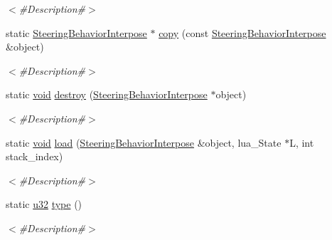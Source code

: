 \begin{DoxyCompactItemize}
\begin{DoxyCompactList}\small\item\em $<$\#\+Description\#$>$ \end{DoxyCompactList}\item 
static \mbox{\hyperlink{classnjli_1_1_steering_behavior_interpose}{Steering\+Behavior\+Interpose}} $\ast$ \mbox{\hyperlink{classnjli_1_1_steering_behavior_interpose_a783a835d9c0bbbe7b99426667ac9afd5}{copy}} (const \mbox{\hyperlink{classnjli_1_1_steering_behavior_interpose}{Steering\+Behavior\+Interpose}} \&object)
\begin{DoxyCompactList}\small\item\em $<$\#\+Description\#$>$ \end{DoxyCompactList}\item 
static \mbox{\hyperlink{_thread_8h_af1e856da2e658414cb2456cb6f7ebc66}{void}} \mbox{\hyperlink{classnjli_1_1_steering_behavior_interpose_ad15b4e28b4593217f193a84ae32168bd}{destroy}} (\mbox{\hyperlink{classnjli_1_1_steering_behavior_interpose}{Steering\+Behavior\+Interpose}} $\ast$object)
\begin{DoxyCompactList}\small\item\em $<$\#\+Description\#$>$ \end{DoxyCompactList}\item 
static \mbox{\hyperlink{_thread_8h_af1e856da2e658414cb2456cb6f7ebc66}{void}} \mbox{\hyperlink{classnjli_1_1_steering_behavior_interpose_a1697eccc9b53896e05a77d088a1dc862}{load}} (\mbox{\hyperlink{classnjli_1_1_steering_behavior_interpose}{Steering\+Behavior\+Interpose}} \&object, lua\+\_\+\+State $\ast$L, int stack\+\_\+index)
\begin{DoxyCompactList}\small\item\em $<$\#\+Description\#$>$ \end{DoxyCompactList}\item 
static \mbox{\hyperlink{_util_8h_a10e94b422ef0c20dcdec20d31a1f5049}{u32}} \mbox{\hyperlink{classnjli_1_1_steering_behavior_interpose_ae1701ef534872d5b6bd4170a8460aab8}{type}} ()
\begin{DoxyCompactList}\small\item\em $<$\#\+Description\#$>$ \end{DoxyCompactList}\end{DoxyCompactItemize}
